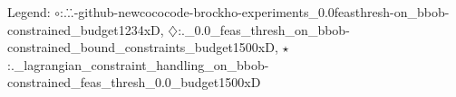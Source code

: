 Legend: {\color{NavyBlue}$\circ$}:.\..\..\numbbo-github\numbbo-newcococode-brockho\code-experiments\build\python\exdata\cobyla\_0.0feasthresh-on\_bbob-constrained\_budget1234xD, {\color{Magenta}$\diamondsuit$}:.\fmincon\_0.0\_feas\_thresh\_on\_bbob-constrained\_bound\_constraints\_budget1500xD, {\color{Orange}$\star$}:.\augmented\_lagrangian\_constraint\_handling\_on\_bbob-constrained\_feas\_thresh\_0.0\_budget1500xD